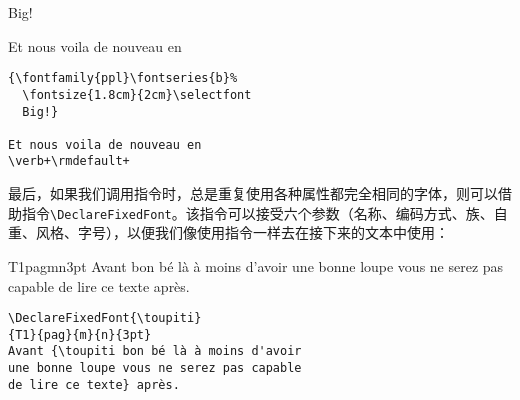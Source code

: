 \begin{codelist}[9.14]{
    { %
  \fontsize{1.8cm}{2cm}\selectfont
  Big!}
  
Et nous voila de nouveau en
}\begin{verbatim}
{\fontfamily{ppl}\fontseries{b}%
  \fontsize{1.8cm}{2cm}\selectfont
  Big!}

Et nous voila de nouveau en
\verb+\rmdefault+
\end{verbatim}
\end{codelist}

最后，如果我们调用指令时，总是重复使用各种属性都完全相同的字体，则可以借助指令\verb|\DeclareFixedFont|。该指令可以接受六个参数（名称、编码方式、族、自重、风格、字号），以便我们像使用指令一样去在接下来的文本中使用：

\begin{codelist}[9.15]{
\DeclareFixedFont{\toupiti}
{T1}{pag}{m}{n}{3pt}
Avant {\toupiti bon bé là à moins d'avoir
une bonne loupe vous ne serez pas capable
de lire ce texte} après.
}\begin{verbatim}
\DeclareFixedFont{\toupiti}
{T1}{pag}{m}{n}{3pt}
Avant {\toupiti bon bé là à moins d'avoir
une bonne loupe vous ne serez pas capable
de lire ce texte} après.
\end{verbatim}
\end{codelist}

